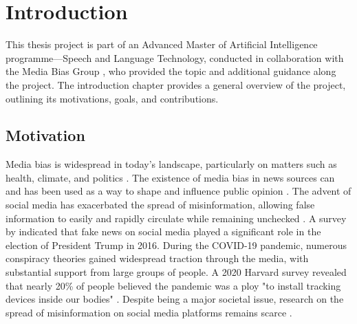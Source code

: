 \chapter{Introduction}
\label{cha:1}

This thesis project is part of an Advanced Master of Artificial Intelligence programme—Speech and Language Technology, conducted in collaboration with the Media Bias Group \cite{media-bias-group}, who provided the topic and additional guidance along the project. The introduction chapter provides a general overview of the project, outlining its motivations, goals, and contributions.


\section{Motivation}

Media bias is widespread in today's landscape, particularly on matters such as health, climate, and politics \cite{suarez-2021-prevalence-health-misinformation,wang-2024-health-misinformation,fleming-2023-climate-disinformation,tiedemann-2024-misinformation-democracy}. The existence of media bias in news sources can and has been used as a way to shape and influence public opinion \cite{aires-2020-information}. The advent of social media has exacerbated the spread of misinformation, allowing false information to easily and rapidly circulate while remaining unchecked \cite{froehlich-2024-misinformation}. A survey by \cite{allcott-2017-fake-news-election} indicated that fake news on social media played a significant role in the election of President Trump in 2016. During the COVID-19 pandemic, numerous conspiracy theories gained widespread traction through the media, with substantial support from large groups of people. A 2020 Harvard survey revealed that nearly 20\% of people believed the pandemic was a ploy "to install tracking devices inside our bodies" \cite{enders-2020-covid19-misinformation}. Despite being a major societal issue, research on the spread of misinformation on social media platforms remains scarce \cite{muhammed-2022-disaster-of-misinformation}.

